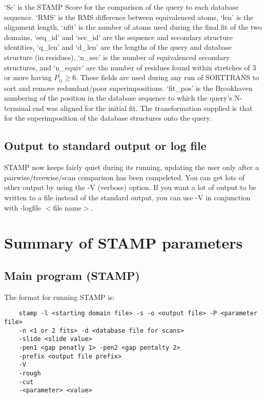     `Sc' is the STAMP Score for the comparison of the query to each 
    database sequence. `RMS' is the RMS difference between equivalenced
    atoms, `len' is the alignment length, `nfit' is the number of atoms
    used during the final fit of the two domains, `seq\_id' and `sec\_id' are the
    sequence and secondary structure identities, `q\_len' and `d\_len' are
    the lengths of the query and database structure (in residues), `n\_sec'
    is the number of equivalenced secondary structures, and `n\_equiv' are
    the number of residues found within stretches of 3 or more having 
    $P_{ij}^{\prime} \geq 6$.  These fields are used during any
    run of SORTTRANS to sort and remove redundant/poor superimpositions.
    `fit\_pos' is the 
    Brookhaven numbering of the position in the database sequence to 
    which the query's N-terminal end was aligned for the initial fit.
    The transformation supplied is that for the superimposition of the 
    database structures onto the query. 

    \section{Output to standard output or log file}

    STAMP now keeps fairly quiet during its running, updating the user only
    after a pairwise/treewise/scan comparison has been compeleted.  You can
    get lots of other output by using the -V (verbose) option.  If you want a lot of
    output to be written to a file instead of the standard output, you 
    can use -V in conjunction with -logfile $<$file name$>$. 

    \chapter{Summary of STAMP parameters}

    \section{Main program (STAMP)}

    The format for running STAMP is:

    \begin{scriptsize}\begin{verbatim}
    stamp -l <starting domain file> -s -o <output file> -P <parameter file>
    -n <1 or 2 fits> -d <database file for scans> 
    -slide <slide value>
    -pen1 <gap penatly 1> -pen2 <gap pentalty 2> 
    -prefix <output file prefix>
    -V
    -rough 
    -cut
    -<parameter> <value>
    \end{verbatim} \end{scriptsize}

